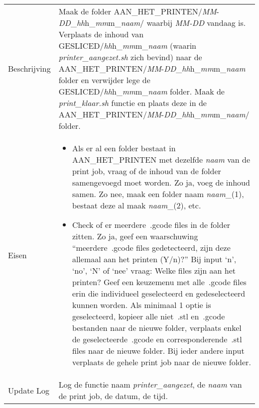 \documentclass{article}
\newcommand{\quotes}[1]{``#1''}
\begin{document}
\begin{table}[H]
    \centering
    \begin{tabular}%
    {>{\raggedright\arraybackslash}p{}%
    |>{\raggedright\arraybackslash}p{}}
    \rowcolor{myblue} \multicolumn{2}{c}{\rule{0pt}{13pt}Functie: {\Large printer\_aangezet.sh}} \\\hline
    Beschrijving & Maak de folder AAN\_HET\_PRINTEN/\textit{MM}-\textit{DD}\_\textit{hh}h\_\textit{mm}m\_\textit{naam}/ waarbij \textit{MM-DD} vandaag is. Verplaats de inhoud van GESLICED/\textit{hh}h\_\textit{mm}m\_\textit{naam} (waarin \textit{printer\_aangezet.sh} zich bevind) naar de AAN\_HET\_PRINTEN/\textit{MM}-\textit{DD}\_\textit{hh}h\_\textit{mm}m\_\textit{naam} folder en verwijder lege de GESLICED/\textit{hh}h\_\textit{mm}m\_\textit{naam} folder. Maak de \textit{print\_klaar.sh} functie en plaats deze in de AAN\_HET\_PRINTEN/\textit{MM}-\textit{DD}\_\textit{hh}h\_\textit{mm}m\_\textit{naam}/ folder.\\ Eisen & 
    \begin{itemize} 
  \item Als er al een folder bestaat in AAN\_HET\_PRINTEN met dezelfde \textit{naam} van de print job, vraag of de inhoud van de folder samengevoegd moet worden. Zo ja, voeg de inhoud samen. Zo nee, maak een folder naam \textit{naam}\_(1), bestaat deze al maak \textit{naam}\_(2), etc.
  \item Check of er meerdere~.gcode files in de folder zitten. Zo ja, geef een waarschuwing \quotes{meerdere~.gcode files gedetecteerd, zijn deze allemaal aan het printen (Y/n)?} Bij input `n', `no', `N' of `nee' vraag: Welke files zijn aan het printen? Geef een keuzemenu met alle~.gcode files erin die individueel geselecteerd en gedeselecteerd kunnen worden. Als minimaal 1 optie is geselecteerd, kopieer alle niet~.stl en~.gcode bestanden naar de nieuwe folder, verplaats enkel de geselecteerde~.gcode en corresponderende~.stl files naar de nieuwe folder. Bij ieder andere input verplaats de gehele print job naar de nieuwe folder.
\end{itemize} \\
  Update Log&Log de functie naam \textit{printer\_aangezet}, de \textit{naam} van de print job, de datum, de tijd.\\
    \end{tabular}
\end{table}
\end{document}
